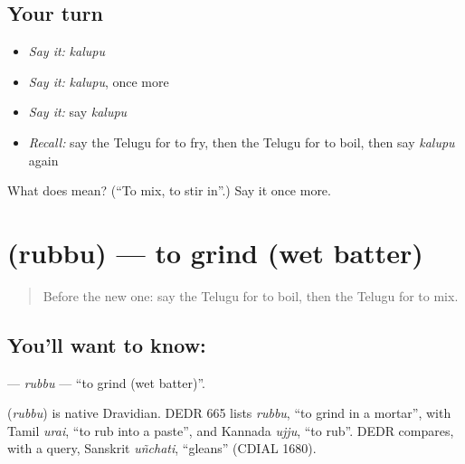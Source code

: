 \subsection*{Your turn}
\begin{itemize}
\raggedright
  \item \emph{Say it:} \emph{kalupu}
  \item \emph{Say it:} \emph{kalupu}, once more
  \item \emph{Say it:} say \emph{kalupu}
  \item \emph{Recall:} say the Telugu for to fry, then the Telugu for to boil, then say \emph{kalupu} again
\end{itemize}

\begin{tcolorbox}[breakable,colback=teal!4,colframe=teal!35!black,title={Before you move on}]
What does  mean? (\textquotedblleft{}To mix, to stir in\textquotedblright{}.) Say it once more.
\end{tcolorbox}
\section[\texorpdfstring{\te{రుబ్బు} (rubbu)}{రుబ్బు (rubbu)}]{ (rubbu) — to grind (wet batter)}

\label{lesson:TE-C157-rubbu}



\begin{quote}
Before the new one: say the Telugu for to boil, then the Telugu for to mix.
\end{quote}

\subsection*{You'll want to know: }
\textbf{} — \emph{rubbu} — \textquotedblleft{}to grind (wet batter)\textquotedblright{}.

\begin{cousinweb}
\textbf{} (\emph{rubbu}) is native Dravidian. DEDR 665 lists \emph{rubbu}, \textquotedblleft{}to grind in a mortar\textquotedblright{}, with Tamil \emph{urai}, \textquotedblleft{}to rub into a paste\textquotedblright{}, and Kannada \emph{ujju}, \textquotedblleft{}to rub\textquotedblright{}. DEDR compares, with a query, Sanskrit \emph{uñchati}, \textquotedblleft{}gleans\textquotedblright{} (CDIAL 1680).
\end{cousinweb}

